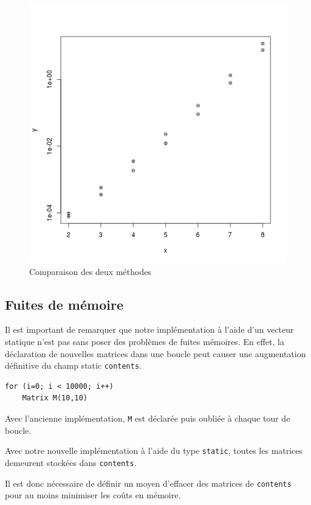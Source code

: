 \documentclass[a4paper,11pt]{article}
\begin{document}
\begin{figure}
  \centering
  \includegraphics[scale=0.5]{Comparaison.png}
  \caption{Comparaison des deux méthodes}
  \label{fig:phd}
\end{figure}


\subsection{Fuites de mémoire}

Il est important de remarquer que notre implémentation à l'aide d'un vecteur statique n'est pas sans poser des problèmes de fuites mémoires.
En effet, la déclaration de nouvelles matrices dans une boucle peut causer une augmentation définitive du champ static \texttt{contents}.

\begin{lstlisting}
for (i=0; i < 10000; i++)
    Matrix M(10,10)
\end{lstlisting}


Avec l'ancienne implémentation, \texttt{M} est déclarée puis oubliée à chaque tour de boucle.

Avec notre nouvelle implémentation à l'aide du type \texttt{static}, toutes les matrices demeurent stockées dans \texttt{contents}.

Il est donc nécessaire de définir un moyen d'effacer des matrices de \texttt{contents} pour au moins minimiser les coûts en mémoire.
\end{document}
